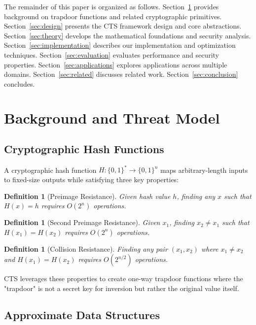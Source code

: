 \documentclass[10pt,conference]{IEEEtran}
\newtheorem{definition}[theorem]{Definition}
\begin{document}
The remainder of this paper is organized as follows. Section~\ref{sec:background} provides background on trapdoor functions and related cryptographic primitives. Section~\ref{sec:design} presents the CTS framework design and core abstractions. Section~\ref{sec:theory} develops the mathematical foundations and security analysis. Section~\ref{sec:implementation} describes our implementation and optimization techniques. Section~\ref{sec:evaluation} evaluates performance and security properties. Section~\ref{sec:applications} explores applications across multiple domains. Section~\ref{sec:related} discusses related work. Section~\ref{sec:conclusion} concludes.

\section{Background and Threat Model}
\label{sec:background}

\subsection{Cryptographic Hash Functions}

A cryptographic hash function $H: \{0,1\}^* \rightarrow \{0,1\}^n$ maps arbitrary-length inputs to fixed-size outputs while satisfying three key properties:

\begin{definition}[Preimage Resistance]
Given hash value $h$, finding any $x$ such that $H(x) = h$ requires $O(2^n)$ operations.
\end{definition}

\begin{definition}[Second Preimage Resistance]
Given $x_1$, finding $x_2 \neq x_1$ such that $H(x_1) = H(x_2)$ requires $O(2^n)$ operations.
\end{definition}

\begin{definition}[Collision Resistance]
Finding any pair $(x_1, x_2)$ where $x_1 \neq x_2$ and $H(x_1) = H(x_2)$ requires $O(2^{n/2})$ operations.
\end{definition}

CTS leverages these properties to create one-way trapdoor functions where the "trapdoor" is not a secret key for inversion but rather the original value itself.

\subsection{Approximate Data Structures}
\end{document}
